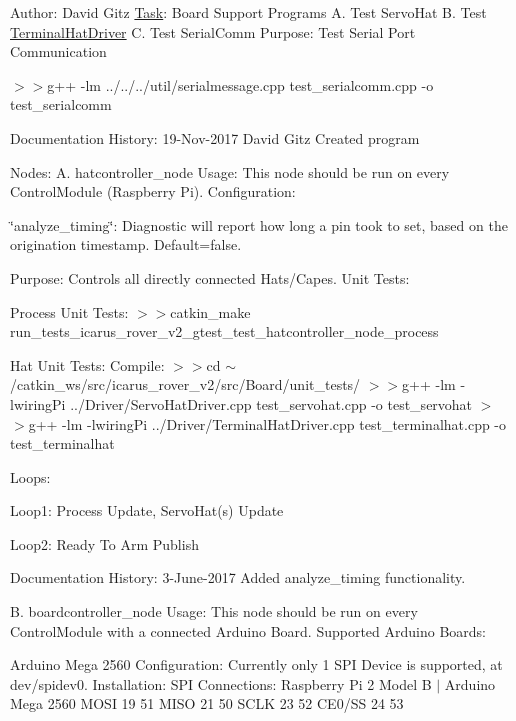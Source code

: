 Author\+: David Gitz \hyperlink{structTask}{Task}\+: Board Support Programs A. Test Servo\+Hat B. Test \hyperlink{classTerminalHatDriver}{Terminal\+Hat\+Driver} C. Test Serial\+Comm Purpose\+: Test Serial Port Communication

$>$$>$g++ -\/lm ../../../util/serialmessage.cpp test\+\_\+serialcomm.\+cpp -\/o test\+\_\+serialcomm

Documentation History\+: 19-\/\+Nov-\/2017 David Gitz Created program

Nodes\+: A. hatcontroller\+\_\+node Usage\+: This node should be run on every Control\+Module (Raspberry Pi). Configuration\+:
\begin{DoxyItemize}
\item \char`\"{}analyze\+\_\+timing\char`\"{}\+: Diagnostic will report how long a pin took to set, based on the origination timestamp. Default=false.
\end{DoxyItemize}

Purpose\+: Controls all directly connected Hats/\+Capes. Unit Tests\+:
\begin{DoxyEnumerate}
\item Process Unit Tests\+: $>$$>$catkin\+\_\+make run\+\_\+tests\+\_\+icarus\+\_\+rover\+\_\+v2\+\_\+gtest\+\_\+test\+\_\+hatcontroller\+\_\+node\+\_\+process
\item Hat Unit Tests\+: Compile\+: $>$$>$cd $\sim$/catkin\+\_\+ws/src/icarus\+\_\+rover\+\_\+v2/src/\+Board/unit\+\_\+tests/ $>$$>$g++ -\/lm -\/lwiring\+Pi ../\+Driver/\+Servo\+Hat\+Driver.cpp test\+\_\+servohat.\+cpp -\/o test\+\_\+servohat $>$$>$g++ -\/lm -\/lwiring\+Pi ../\+Driver/\+Terminal\+Hat\+Driver.cpp test\+\_\+terminalhat.\+cpp -\/o test\+\_\+terminalhat
\end{DoxyEnumerate}

Loops\+:
\begin{DoxyItemize}
\item Loop1\+: Process Update, Servo\+Hat(s) Update
\item Loop2\+: Ready To Arm Publish
\end{DoxyItemize}

Documentation History\+: 3-\/\+June-\/2017 Added analyze\+\_\+timing functionality.

B. boardcontroller\+\_\+node Usage\+: This node should be run on every Control\+Module with a connected Arduino Board. Supported Arduino Boards\+:
\begin{DoxyItemize}
\item Arduino Mega 2560 Configuration\+: Currently only 1 S\+PI Device is supported, at dev/spidev0. Installation\+: S\+PI Connections\+: Raspberry Pi 2 Model B $\vert$ Arduino Mega 2560 M\+O\+SI 19 51 M\+I\+SO 21 50 S\+C\+LK 23 52 C\+E0/\+SS 24 53
\end{DoxyItemize}

